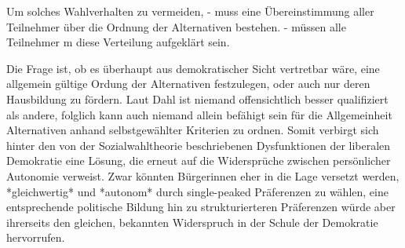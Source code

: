 Um solches Wahlverhalten zu vermeiden,
- muss eine Übereinstimmung aller Teilnehmer über die Ordnung der Alternativen bestehen.
- müssen alle Teilnehmer m diese Verteilung aufgeklärt sein.

Die Frage ist, ob es überhaupt aus demokratischer Sicht vertretbar wäre, eine allgemein gültige Ordung der Alternativen festzulegen, oder auch nur deren Hausbildung zu fördern.
Laut Dahl ist niemand offensichtlich besser qualifiziert als andere, folglich kann auch niemand allein befähigt sein für die Allgemeinheit Alternativen anhand selbstgewählter Kriterien zu ordnen.
Somit verbirgt sich hinter den von der Sozialwahltheorie beschriebenen Dysfunktionen der liberalen Demokratie eine Lösung, die erneut auf die Widersprüche zwischen persönlicher Autonomie verweist.
Zwar könnten Bürgerinnen eher in die Lage versetzt werden, *gleichwertig* und *autonom* durch single-peaked Präferenzen zu wählen, eine entsprechende politische Bildung hin zu strukturierteren Präferenzen würde aber ihrerseits den gleichen, bekannten Widerspruch in der Schule der Demokratie hervorrufen.
